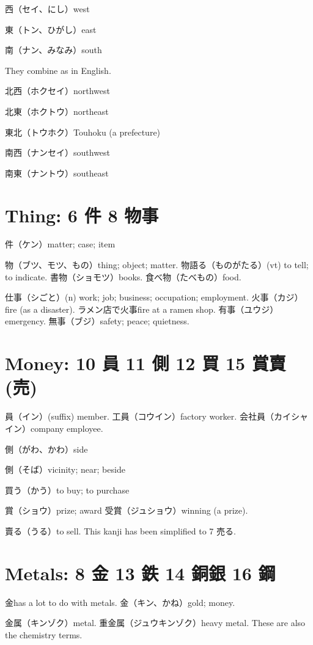 西（セイ、にし）west

東（トン、ひがし）east

南（ナン、みなみ）south

They combine as in English.

北西（ホクセイ）northwest

北東（ホクトウ）northeast

東北（トウホク）Touhoku (a prefecture)

南西（ナンセイ）southwest

南東（ナントウ）southeast

\section{Thing: 6 件 8 物事}

件（ケン）matter; case; item

物（ブツ、モツ、もの）thing; object; matter.
物語る（ものがたる）(vt) to tell; to indicate.
書物（ショモツ）books.
食べ物（たべもの）food.

仕事（シごと）(n) work; job; business; occupation; employment.
火事（カジ）fire (as a disaster).
ラメン店で火事fire at a ramen shop.
有事（ユウジ）emergency.
無事（ブジ）safety; peace; quietness.

\section{Money: 10 員 11 側 12 買 15 賞賣(売)}

員（イン）(suffix) member.
工員（コウイン）factory worker.
会社員（カイシャイン）company employee.

側（がわ、かわ）side

側（そば）vicinity; near; beside

買う（かう）to buy; to purchase

賞（ショウ）prize; award
受賞（ジュショウ）winning (a prize).

賣る（うる）to sell.
This kanji has been simplified to 7 売る.

\section{Metals: 8 金 13 鉄 14 銅銀 16 鋼}

金has a lot to do with metals.
金（キン、かね）gold; money.

金属（キンゾク）metal.
重金属（ジュウキンゾク）heavy metal.
These are also the chemistry terms.

